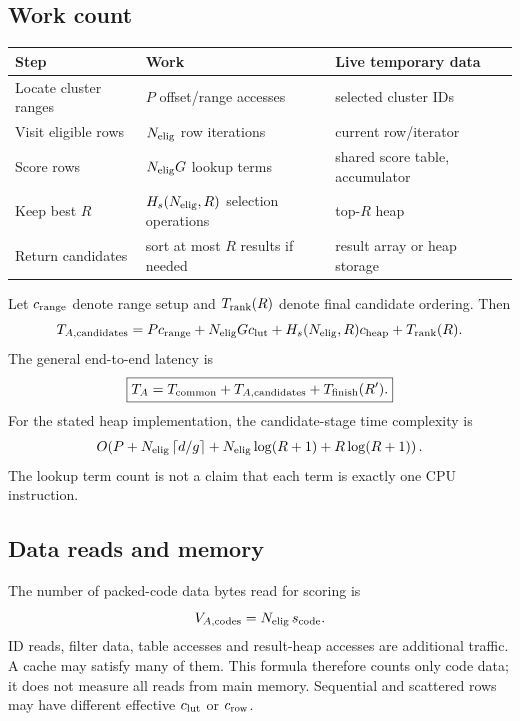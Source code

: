 \subsection{Work count}
\begin{center}\small
\begin{tabularx}{\linewidth}{@{}P{.25\linewidth}YP{.23\linewidth}@{}}\toprule
Step & Work & Live temporary data\\\midrule
Locate cluster ranges & $P$ offset/range accesses & selected cluster IDs\\
Visit eligible rows & $N_{\mathrm{elig}}$ row iterations & current row/iterator\\
Score rows & $N_{\mathrm{elig}} G$ lookup terms & shared score table, accumulator\\
Keep best $R$ & $H_s(N_{\mathrm{elig}},R)$ selection operations & top-$R$ heap\\
Return candidates & sort at most $R$ results if needed & result array or heap storage\\\bottomrule
\end{tabularx}\normalsize\end{center}

Let $c_{\rm range}$ denote range setup and $T_{\rm rank}(R)$ denote final candidate ordering. Then
\begin{equation}
T_{A,\rm candidates}=P c_{\rm range}+N_{\mathrm{elig}} G c_{\rm lut}
                    +H_s(N_{\mathrm{elig}},R)c_{\rm heap}+T_{\rm rank}(R).
\label{eq:scan-time}
\end{equation}
The general end-to-end latency is
\begin{equation}
\boxed{T_A=T_{\mathrm{common}}+T_{A,\rm candidates}+T_{\mathrm{finish}}(R').}
\label{eq:scan-total}
\end{equation}
For the stated heap implementation, the candidate-stage time complexity is
\[
O\!\left(P+N_{\mathrm{elig}}\left\lceil d/g\right\rceil+N_{\mathrm{elig}}\log(R+1)+R\log(R+1)\right).
\]
The lookup term count is not a claim that each term is exactly one CPU instruction.

\subsection{Data reads and memory}
The number of packed-code data bytes read for scoring is
\begin{equation}
V_{A,\rm codes}=N_{\mathrm{elig}}\,s_{\rm code}.
\end{equation}
ID reads, filter data, table accesses and result-heap accesses are additional traffic. A cache
may satisfy many of them. This formula therefore counts only code data; it does not measure all reads from main memory.
Sequential and scattered rows may have different effective $c_{\rm lut}$ or $c_{\rm row}$.

